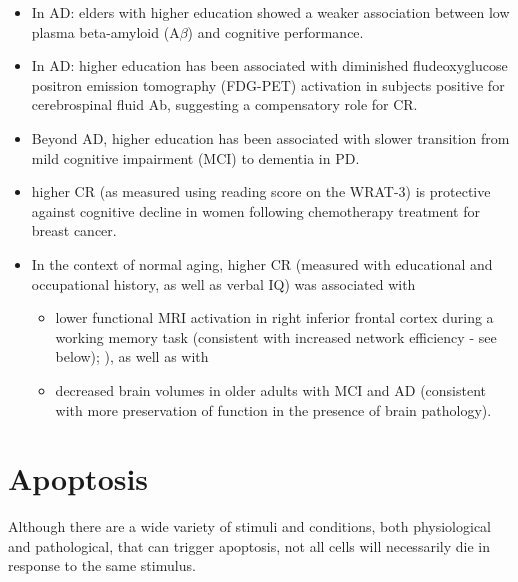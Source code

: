 \begin{itemize}
  \item  In AD: elders with higher education showed a weaker association between
  low plasma beta-amyloid (A$\beta$) and cognitive performance.
  
  \item In AD: higher education has been associated with diminished
fludeoxyglucose positron emission tomography (FDG-PET) activation in subjects
positive for cerebrospinal fluid Ab, suggesting a compensatory role for CR.
 
  \item Beyond AD, higher education has been associated with
slower transition from mild cognitive impairment (MCI) to
dementia in PD.

  \item higher CR (as measured
using reading score on the WRAT-3) is protective against cognitive decline in
women following chemotherapy treatment for breast cancer.

  \item In the context of normal aging, higher CR (measured with educational and
  occupational history, as well as verbal IQ) was associated with 
  
  \begin{itemize}
    \item   lower  functional MRI activation in right inferior
frontal cortex during a working memory task (consistent with increased network
efficiency - see below); ), as well as with 

   \item decreased brain volumes in older adults with MCI and AD (consistent
   with more preservation of function in the presence of brain pathology).
  \end{itemize}


\end{itemize}






\chapter{Apoptosis}
\label{sec:apoptosis}

Although there are a wide variety of stimuli and conditions, both physiological
and pathological, that can trigger apoptosis, not all cells will necessarily die
in response to the same stimulus.

